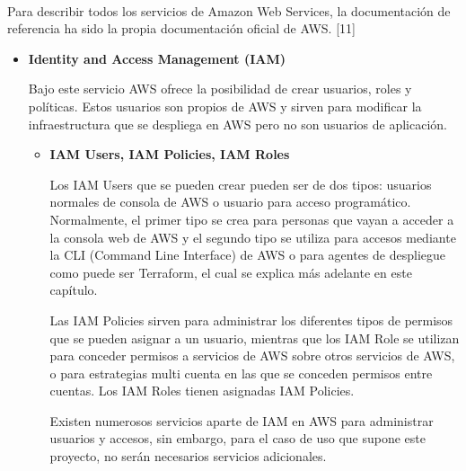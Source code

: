 \documentclass[../../memoria.tex]{subfiles}
\begin{document}
\paragraph{}
Para describir todos los servicios de Amazon Web Services, la documentación de referencia ha sido la propia documentación oficial de AWS. [11]
\begin{itemize}
    \item \textbf{Identity and Access Management (IAM)}
          \par
          Bajo este servicio AWS ofrece la posibilidad de crear usuarios, roles y políticas. Estos usuarios son propios de AWS y sirven para modificar la infraestructura que se despliega en AWS pero no son usuarios de aplicación.
          \begin{itemize}
              \item \textbf{IAM Users, IAM Policies, IAM Roles}
                    \par
                    Los IAM Users que se pueden crear pueden ser de dos tipos: usuarios normales de consola de AWS o usuario para acceso programático. Normalmente, el primer tipo se crea para personas que vayan a acceder a la consola web de AWS y el segundo tipo se utiliza para accesos mediante la CLI (Command Line Interface) de AWS o para agentes de despliegue como puede ser Terraform, el cual se explica más adelante en este capítulo.
                    \par
                    Las IAM Policies sirven para administrar los diferentes tipos de permisos que se pueden asignar a un usuario, mientras que los IAM Role se utilizan para conceder permisos a servicios de AWS sobre otros servicios de AWS, o para estrategias multi cuenta en las que se conceden permisos entre cuentas. Los IAM Roles tienen asignadas IAM Policies.
                    \par
                    Existen numerosos servicios aparte de IAM en AWS para administrar usuarios y accesos, sin embargo, para el caso de uso que supone este proyecto, no serán necesarios servicios adicionales.
          \end{itemize}


\end{itemize}
\end{document}
